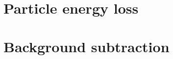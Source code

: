 \section{Particle energy loss}\label{sec:energyLoss}
\section{Background subtraction}\label{sec:bkgdSubtraction}

% 
% 
% 
% 
% 
% 
% 
% 
